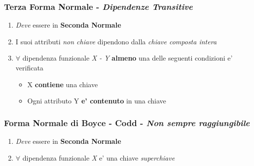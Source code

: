 \documentclass[a4paper, 12pt]{report}
\begin{document}
   \subsubsection{Terza Forma Normale - \textit{Dipendenze Transitive}}
   \begin{enumerate}
       \item \textit{Deve} essere in \textbf{Seconda Normale}
       \item I suoi attributi \textit{non chiave} dipendono dalla \textit{chiave composta intera}
       \item \(\forall\) dipendenza funzionale \textit{X - Y} \textbf{almeno} una delle seguenti condizioni e' verificata
       \begin{itemize}
           \item X  \textbf{contiene} una chiave
           \item Ogni attributo Y \textbf{e' contenuto} in una chiave
       \end{itemize}
   \end{enumerate}

\subsubsection{Forma Normale di Boyce - Codd - \textit{Non sempre raggiungibile}}
\begin{enumerate}
    \item \textit{Deve} essere in \textbf{Seconda Normale}
    \item \(\forall\) dipendenza funzionale \textit{X} e' una chiave \textit{superchiave}
\end{enumerate}
\end{document}

